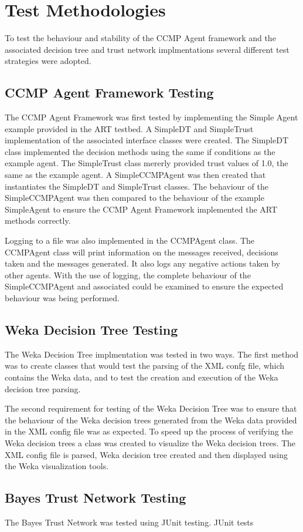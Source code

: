 \section{Test Methodologies}
To test the behaviour and stability of the CCMP Agent framework and the
associated decision tree and trust network implmentations several different test
strategies were adopted.

\subsection{CCMP Agent Framework Testing}
The CCMP Agent Framework was first tested by implementing the
Simple Agent example provided in the ART testbed.  A SimpleDT and
SimpleTrust implementation of the associated interface classes were created.
The SimpleDT class implemented the decision methods using the same if conditions
as the example agent.  The SimpleTrust class mererly provided trust values of
1.0, the same as the example agent.  A SimpleCCMPAgent was then created that
instantiates the SimpleDT and SimpleTrust classes.  The behaviour of the
SimpleCCMPAgent was then compared to the behaviour of the example SimpleAgent
to ensure the CCMP Agent Framework implemented the ART methods correctly.

Logging to a file was also implemented in the CCMPAgent class.  The CCMPAgent
class will print information on the messages received, decisions taken and the
messages generated.  It also logs any negative actions taken by other agents.
With the use of logging, the complete behaviour of the SimpleCCMPAgent and
associated  could be examined to ensure the expected behaviour was being
performed.

\subsection{Weka Decision Tree Testing}
The Weka Decision Tree implmentation was tested in two ways.  The first
method was to create classes that would test the parsing of the XML confg
file, which contains the Weka data, and to test the creation and execution of
the Weka decision tree parsing.

The second requirement for testing of the Weka Decision Tree was to ensure
that the behaviour of the Weka decision trees generated from the Weka data
provided in the XML config file was as expected.  To speed up the process of
verifying the Weka decision trees a class was created to visualize the Weka
decision trees.  The XML config file is parsed, Weka decision tree created and
then displayed using the Weka visualization tools.

\subsection{Bayes Trust Network Testing}
The Bayes Trust Network was tested using JUnit testing.  JUnit tests


